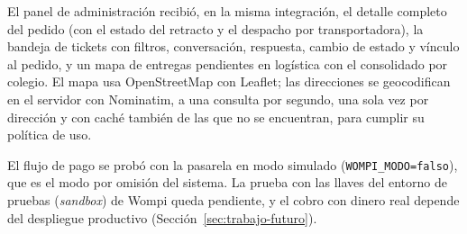 El panel de administración recibió, en la misma integración, el detalle completo del pedido (con el
estado del retracto y el despacho por transportadora), la bandeja de tickets con filtros,
conversación, respuesta, cambio de estado y vínculo al pedido, y un mapa de entregas pendientes en
logística con el consolidado por colegio. El mapa usa OpenStreetMap con Leaflet; las direcciones se
geocodifican en el servidor con Nominatim, a una consulta por segundo, una sola vez por dirección y
con caché también de las que no se encuentran, para cumplir su política de uso.

El flujo de pago se probó con la pasarela en modo simulado (\texttt{WOMPI\_MODO=falso}), que es
el modo por omisión del sistema. La prueba con las llaves del entorno de pruebas (\emph{sandbox})
de Wompi queda pendiente, y
el cobro con dinero real depende del despliegue productivo (Sección~\ref{sec:trabajo-futuro}).



